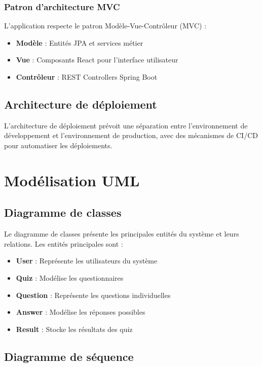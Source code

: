 \documentclass[12pt,a4paper]{report}
\begin{document}
\subsubsection{Patron d'architecture MVC}

L'application respecte le patron Modèle-Vue-Contrôleur (MVC) :

\begin{itemize}
    \item \textbf{Modèle} : Entités JPA et services métier
    \item \textbf{Vue} : Composants React pour l'interface utilisateur
    \item \textbf{Contrôleur} : REST Controllers Spring Boot
\end{itemize}

\subsection{Architecture de déploiement}

L'architecture de déploiement prévoit une séparation entre l'environnement de développement et l'environnement de production, avec des mécanismes de CI/CD pour automatiser les déploiements.

\section{Modélisation UML}

\subsection{Diagramme de classes}

Le diagramme de classes présente les principales entités du système et leurs relations. Les entités principales sont :

\begin{itemize}
    \item \textbf{User} : Représente les utilisateurs du système
    \item \textbf{Quiz} : Modélise les questionnaires
    \item \textbf{Question} : Représente les questions individuelles
    \item \textbf{Answer} : Modélise les réponses possibles
    \item \textbf{Result} : Stocke les résultats des quiz
\end{itemize}

\subsection{Diagramme de séquence}
\end{document}
